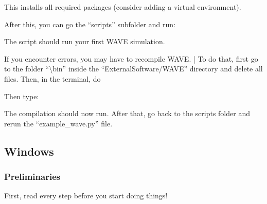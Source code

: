 \documentclass[letterpaper,10pt,english]{sphinxmanual}
\begin{document}
\begin{DUlineblock}{0em}
\item[] This installs all required packages (consider adding a virtual environment).
\end{DUlineblock}

\begin{DUlineblock}{0em}
\item[] After this, you can go the “scripts” subfolder and run:
\end{DUlineblock}

\begin{sphinxVerbatim}[commandchars=\\\{\}]
\end{sphinxVerbatim}

\sphinxAtStartPar
The script should run your first WAVE simulation.

\sphinxAtStartPar
If you encounter errors, you may have to recompile WAVE.
| To do that, first go to the folder “\textbackslash{}bin” inside the “External\sphinxhyphen{}Software/WAVE” directory and delete all files. Then, in the terminal, do

\begin{sphinxVerbatim}[commandchars=\\\{\}]
\end{sphinxVerbatim}

\sphinxAtStartPar
Then type:

\begin{sphinxVerbatim}[commandchars=\\\{\}]
\end{sphinxVerbatim}

\sphinxAtStartPar
The compilation should now run. After that, go back to the scripts folder and re\sphinxhyphen{}run the “example\_wave.py” file.


\subsection{Windows}
\label{\detokenize{installation:windows}}

\subsubsection{Preliminaries}
\label{\detokenize{installation:preliminaries}}
\begin{DUlineblock}{0em}
\item[] First, read every step before you start doing things!
\end{DUlineblock}
\end{document}
